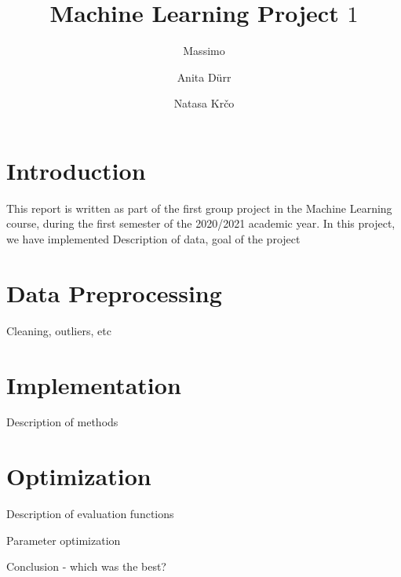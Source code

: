 \documentclass{article}
\begin{document}
	\title{Machine Learning Project $1$}
	
	\author{Massimo \and Anita D\" urr \and Natasa Kr\v co}
	
	\maketitle
	
	\section{Introduction}
	This report is written as part of the first group project in the Machine Learning course, during the first semester of the 2020/2021 academic year. In this project, we have implemented
	Description of data, goal of the project
	
	\section{Data Preprocessing}
	Cleaning, outliers, etc
	
	\section{Implementation}
	Description of methods
	
	\section{Optimization}
	Description of evaluation functions
	
	Parameter optimization
	
	Conclusion - which was the best?
\end{document}
